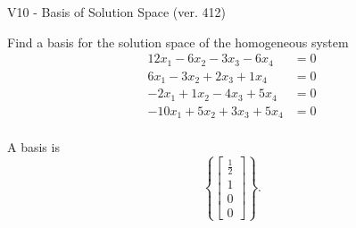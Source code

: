 \begin{exercise}
  \begin{exerciseTitle}V10 - Basis of Solution Space (ver. 412)\end{exerciseTitle}
  \begin{exerciseStatement}
    Find a basis for the solution space of the homogeneous system 
\begin{align*}
 12 x_ 1 -6 x_ 2 -3 x_ 3 -6 x_ 4 &= 0  \\ 
  6 x_ 1 -3 x_ 2 + 2 x_ 3 + 1 x_ 4 &= 0  \\ 
  -2 x_ 1 + 1 x_ 2 -4 x_ 3 + 5 x_ 4 &= 0  \\ 
  -10 x_ 1 + 5 x_ 2 + 3 x_ 3 + 5 x_ 4 &= 0  \\ 
 \end{align*}


 
  \end{exerciseStatement}

  \begin{exerciseAnswer}
   A basis is   
\[\left\{\left[\begin{array}{c}
\frac{1}{2} \\
1 \\
0 \\
0
\end{array}\right]\right\}.\]

  


  \end{exerciseAnswer}
\end{exercise}